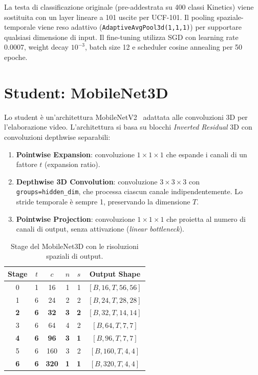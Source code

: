 La testa di classificazione originale (pre-addestrata su 400 classi Kinetics) viene sostituita con un layer lineare a 101 uscite per UCF-101. Il pooling spaziale-temporale viene reso adattivo (\texttt{AdaptiveAvgPool3d(1,1,1)}) per supportare qualsiasi dimensione di input. Il fine-tuning utilizza SGD con learning rate 0.0007, weight decay $10^{-3}$, batch size 12 e scheduler cosine annealing per 50 epoche.

\section{Student: MobileNet3D}

Lo student è un'architettura MobileNetV2~\cite{sandler2018mobilenetv2} adattata alle convoluzioni 3D per l'elaborazione video. L'architettura si basa su blocchi \textit{Inverted Residual} 3D con convoluzioni depthwise separabili:

\begin{enumerate}
    \item \textbf{Pointwise Expansion}: convoluzione $1\times1\times1$ che espande i canali di un fattore $t$ (expansion ratio).
    \item \textbf{Depthwise 3D Convolution}: convoluzione $3\times3\times3$ con \texttt{groups=hidden\_dim}, che processa ciascun canale indipendentemente. Lo stride temporale è sempre 1, preservando la dimensione $T$.
    \item \textbf{Pointwise Projection}: convoluzione $1\times1\times1$ che proietta al numero di canali di output, senza attivazione (\textit{linear bottleneck}).
\end{enumerate}

\begin{table}[H]
\centering
\caption{Stage del MobileNet3D con le risoluzioni spaziali di output.}
\label{tab:student_stages}
\begin{tabular}{cccccc}
\toprule
\textbf{Stage} & \textbf{$t$} & \textbf{$c$} & \textbf{$n$} & \textbf{$s$} & \textbf{Output Shape} \\
\midrule
0 & 1  & 16  & 1 & 1 & $[B, 16, T, 56, 56]$ \\
1 & 6  & 24  & 2 & 2 & $[B, 24, T, 28, 28]$ \\
\textbf{2} & \textbf{6}  & \textbf{32}  & \textbf{3} & \textbf{2} & $[B, 32, T, 14, 14]$ \\
3 & 6  & 64  & 4 & 2 & $[B, 64, T, 7, 7]$ \\
\textbf{4} & \textbf{6}  & \textbf{96}  & \textbf{3} & \textbf{1} & $[B, 96, T, 7, 7]$ \\
5 & 6  & 160 & 3 & 2 & $[B, 160, T, 4, 4]$ \\
\textbf{6} & \textbf{6}  & \textbf{320} & \textbf{1} & \textbf{1} & $[B, 320, T, 4, 4]$ \\
\bottomrule
\end{tabular}
\end{table}

